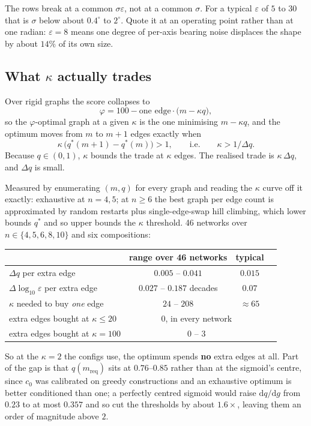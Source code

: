 \documentclass[11pt,a4paper]{article}
\begin{document}
\noindent
The rows break at a common $\sigma\varepsilon$, not at a common $\sigma$. For a typical
$\varepsilon$ of $5$ to $30$ that is $\sigma$ below about $0.4^\circ$ to $2^\circ$. Quote
it at an operating point rather than at one radian: $\varepsilon=8$ means one degree of
per-axis bearing noise displaces the shape by about $14\%$ of its own size.

\subsection{What $\kappa$ actually trades}
\label{sec:kappa}

Over rigid graphs the score collapses to
\[
\varphi=100-\text{one edge}\cdot\big(m-\kappa q\big),
\]
so the $\varphi$-optimal graph at a given $\kappa$ is the one minimising $m-\kappa q$, and
the optimum moves from $m$ to $m+1$ edges exactly when
\[
\kappa\,\big(q^\ast(m+1)-q^\ast(m)\big)>1,
\qquad\text{i.e.}\qquad \kappa>1/\Delta q .
\]
Because $q\in(0,1)$, $\kappa$ bounds the trade at $\kappa$ edges. The realised trade is
$\kappa\,\Delta q$, and $\Delta q$ is small.

Measured by enumerating $(m,q)$ for every graph and reading the $\kappa$ curve off it
exactly: exhaustive at $n=4,5$; at $n\ge6$ the best graph per edge count is approximated
by random restarts plus single-edge-swap hill climbing, which lower bounds $q^\ast$ and so
upper bounds the $\kappa$ threshold. 46 networks over $n\in\{4,5,6,8,10\}$ and six
compositions:

\begin{center}
\begin{tabular}{lccc}
\toprule
 & range over 46 networks & typical \\
\midrule
$\Delta q$ per extra edge & $0.005$ -- $0.041$ & $0.015$ \\
$\Delta\log_{10}\varepsilon$ per extra edge & $0.027$ -- $0.187$ decades & $0.07$ \\
$\kappa$ needed to buy \emph{one} edge & $24$ -- $208$ & $\approx 65$ \\
extra edges bought at $\kappa\le20$ & \multicolumn{2}{c}{$0$, in every network} \\
extra edges bought at $\kappa=100$ & \multicolumn{2}{c}{$0$ -- $3$} \\
\bottomrule
\end{tabular}
\end{center}

\noindent
So at the $\kappa=2$ the configs use, the optimum spends \textbf{no} extra edges at all.
Part of the gap is that $q(m_{\text{req}})$ sits at $0.76$--$0.85$ rather than at the
sigmoid's centre, since $c_0$ was calibrated on greedy constructions and an exhaustive
optimum is better conditioned than one; a perfectly centred sigmoid would raise
$\mathrm dq/\mathrm dg$ from $0.23$ to at most $0.357$ and so cut the thresholds by about
$1.6\times$, leaving them an order of magnitude above $2$.
\end{document}
